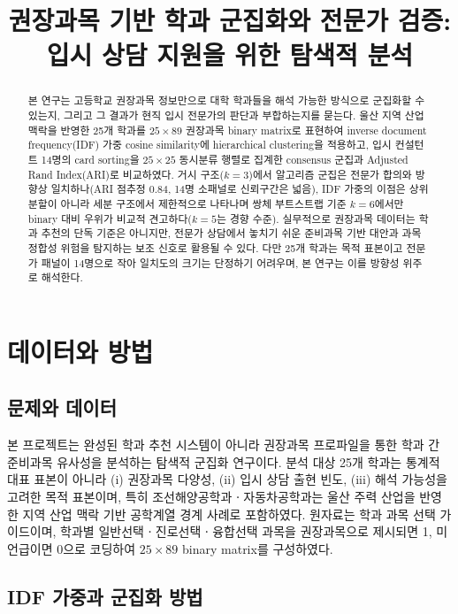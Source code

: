 \documentclass[conference]{IEEEtran}
\title{권장과목 기반 학과 군집화와 전문가 검증: 입시 상담 지원을 위한 탐색적 분석}
\author{
  \IEEEauthorblockN{박재우}
  \IEEEauthorblockA{NOVA50301 Term Project --- 포트폴리오 개정판 (v2)}
}
\begin{document}
\maketitle

\begin{abstract}
본 연구는 고등학교 권장과목 정보만으로 대학 학과들을 해석 가능한 방식으로 군집화할 수 있는지, 그리고 그 결과가 현직 입시 전문가의 판단과 부합하는지를 묻는다.
울산 지역 산업 맥락을 반영한 25개 학과를 $25\times89$ 권장과목 binary matrix로 표현하여 inverse document frequency(IDF) 가중 cosine similarity에 hierarchical clustering을 적용하고, 입시 컨설턴트 14명의 card sorting을 $25\times25$ 동시분류 행렬로 집계한 consensus 군집과 Adjusted Rand Index(ARI)로 비교하였다.
거시 구조($k=3$)에서 알고리즘 군집은 전문가 합의와 방향상 일치하나(ARI 점추정 $0.84$, 14명 소패널로 신뢰구간은 넓음), IDF 가중의 이점은 상위 분할이 아니라 세분 구조에서 제한적으로 나타나며 쌍체 부트스트랩 기준 $k=6$에서만 binary 대비 우위가 비교적 견고하다($k=5$는 경향 수준).
실무적으로 권장과목 데이터는 학과 추천의 단독 기준은 아니지만, 전문가 상담에서 놓치기 쉬운 준비과목 기반 대안과 과목 정합성 위험을 탐지하는 보조 신호로 활용될 수 있다.
다만 25개 학과는 목적 표본이고 전문가 패널이 14명으로 작아 일치도의 크기는 단정하기 어려우며, 본 연구는 이를 방향성 위주로 해석한다.
\end{abstract}

\section{데이터와 방법}

\subsection{문제와 데이터}

본 프로젝트는 완성된 학과 추천 시스템이 아니라 권장과목 프로파일을 통한 학과 간 준비과목 유사성을 분석하는 탐색적 군집화 연구이다.
분석 대상 25개 학과는 통계적 대표 표본이 아니라 (i) 권장과목 다양성, (ii) 입시 상담 출현 빈도, (iii) 해석 가능성을 고려한 목적 표본이며, 특히 조선해양공학과ㆍ자동차공학과는 울산 주력 산업을 반영한 지역 산업 맥락 기반 공학계열 경계 사례로 포함하였다.
원자료는 학과 과목 선택 가이드이며, 학과별 일반선택ㆍ진로선택ㆍ융합선택 과목을 권장과목으로 제시되면 1, 미언급이면 0으로 코딩하여 $25\times89$ binary matrix를 구성하였다.

\subsection{IDF 가중과 군집화 방법}
\end{document}
